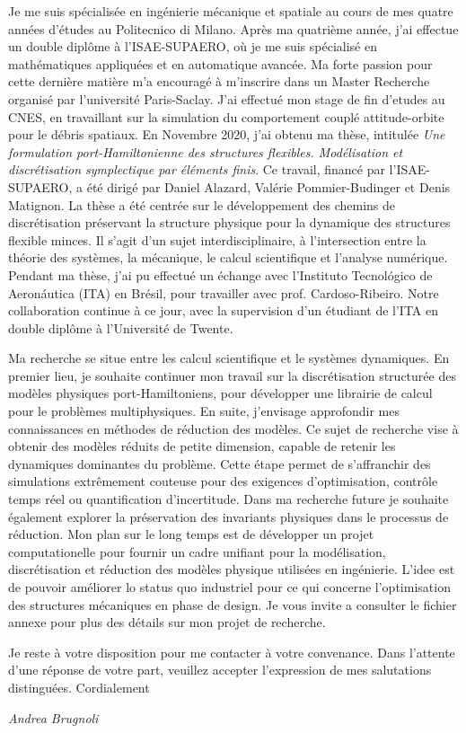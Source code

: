 \documentclass[11pt]{letter}
\begin{document}
	Je me suis spécialisée en ingénierie mécanique et spatiale au cours de mes quatre années d'études au Politecnico di Milano. Après ma quatrième année, j'ai effectue un double diplôme \`a l'ISAE-SUPAERO, o\`u je me suis spécialisé en mathématiques appliquées et en automatique avancée. Ma forte passion pour cette dernière matière m'a encouragé à m'inscrire dans un Master Recherche organisé par l'université Paris-Saclay. J'ai effectué mon stage de fin d'etudes au CNES, en travaillant sur la simulation du comportement couplé attitude-orbite pour le débris spatiaux. En Novembre 2020, j'ai obtenu ma thèse, intitulée \textit{Une formulation port-Hamiltonienne des structures flexibles. Modélisation et discrétisation symplectique par éléments finis}. Ce travail, financé par l'ISAE-SUPAERO, a été dirigé par Daniel Alazard, Valérie Pommier-Budinger et Denis Matignon. La thèse a été centrée sur le développement des chemins de discrétisation préservant la structure physique pour la dynamique des structures flexible minces. Il s'agit d'un sujet interdisciplinaire, \`a l'intersection entre la théorie des systèmes, la mécanique, le calcul scientifique et l'analyse numérique. Pendant ma thèse, j'ai pu effectué un échange avec l'Instituto Tecnológico de Aeronáutica (ITA) en Brésil, pour travailler avec prof. Cardoso-Ribeiro. Notre collaboration continue \`a ce jour, avec la supervision d'un étudiant de l'ITA en double diplôme \`a l'Universit\'e de Twente.
	
	Ma recherche se situe entre les calcul scientifique et le systèmes dynamiques. En premier lieu, je souhaite continuer mon travail sur la discrétisation structurée des modèles physiques port-Hamiltoniens, pour développer une librairie de calcul pour le problèmes multiphysiques. En suite, j'envisage approfondir mes connaissances en méthodes de réduction des modèles. Ce sujet de recherche vise \`a obtenir des modèles réduits de petite dimension, capable de retenir les dynamiques dominantes du problème. Cette étape permet de s'affranchir des simulations extrêmement couteuse pour des exigences d'optimisation, contrôle temps réel ou quantification d'incertitude. Dans ma recherche future je souhaite également explorer la préservation des invariants physiques dans le processus de réduction. Mon plan sur le long temps est de développer un projet computationelle pour fournir un cadre unifiant pour la modélisation, discrétisation et réduction des modèles physique utilisées en ingénierie. L'idee est de pouvoir améliorer lo status quo industriel pour ce qui concerne l'optimisation des structures mécaniques en phase de design. Je vous invite a consulter le fichier annexe pour plus des détails sur mon projet de recherche. 
	

	Je reste à votre disposition pour me contacter à votre convenance. Dans l'attente d'une réponse de votre part, veuillez accepter l'expression de mes salutations distinguées. Cordialement
	
	
	\begin{center}
		\large\textit{Andrea Brugnoli}
	\end{center}
\end{document}
